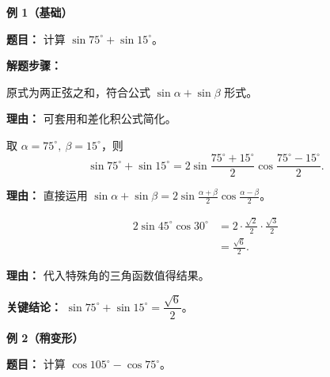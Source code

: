 \begin{examplebox}
	\textbf{\textcolor{CExample}{例 1（基础）}}

	\textbf{\textcolor{CExample}{题目：}}
	计算 $\sin75^\circ + \sin15^\circ$。

	\textbf{\textcolor{CExample}{解题步骤：}}
	\begin{description}[style=nextline, leftmargin=2.8em, labelsep=0.5em, itemsep=0.45em]
		\item[\textbf{第一步（识别结构）：}] 原式为两正弦之和，符合公式 $\sin\alpha+\sin\beta$ 形式。
			\par\textbf{理由：} 可套用和差化积公式简化。
		\item[\textbf{第二步（代入公式）：}] 取 $\alpha=75^\circ,\ \beta=15^\circ$，则
			\[
				\sin75^\circ+\sin15^\circ = 2\sin\frac{75^\circ+15^\circ}{2}\cos\frac{75^\circ-15^\circ}{2}.
			\]
			\par\textbf{理由：} 直接运用 $\sin\alpha+\sin\beta = 2\sin\frac{\alpha+\beta}{2}\cos\frac{\alpha-\beta}{2}$。
		\item[\textbf{第三步（计算数值）：}]
			\[
				\begin{aligned}
					2\sin45^\circ\cos30^\circ &= 2\cdot\frac{\sqrt{2}}{2}\cdot\frac{\sqrt{3}}{2} \\
					&= \frac{\sqrt{6}}{2}.
			\end{aligned}
			\]
			\par\textbf{理由：} 代入特殊角的三角函数值得结果。
	\end{description}

	\textbf{\textcolor{CExample}{关键结论：}}
	$\sin75^\circ+\sin15^\circ = \dfrac{\sqrt{6}}{2}$。

	\medskip
	\textbf{\textcolor{CExample}{例 2（稍变形）}}

	\textbf{\textcolor{CExample}{题目：}}
	计算 $\cos105^\circ - \cos75^\circ$。


\end{examplebox}

